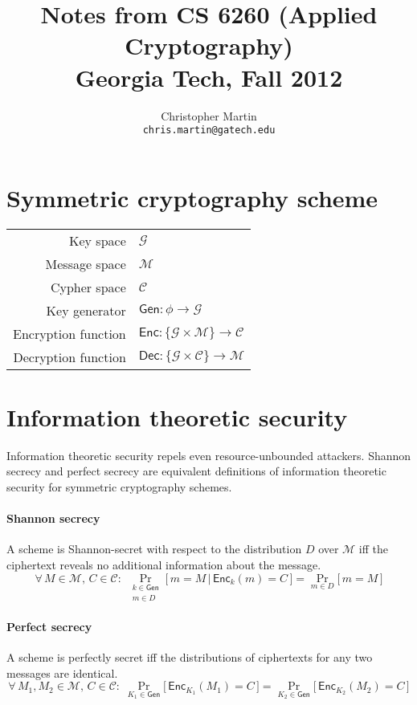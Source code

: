 \documentclass[11pt]{article}
\date{}
\title{Notes from CS 6260 (Applied Cryptography)\\Georgia Tech, Fall 2012}
\author{Christopher Martin\\{\tt chris.martin@gatech.edu}}
\newcommand{\Gen}{\mathsf{Gen}}
\newcommand{\Enc}{\mathsf{Enc}}
\newcommand{\Dec}{\mathsf{Dec}}
\begin{document}
\maketitle

\section{Symmetric cryptography scheme}

\begin{tabular}{r|l}
Key space & $\mathcal{G}$ \\
Message space & $\mathcal{M}$ \\
Cypher space & $\mathcal{C}$ \\
Key generator & $\Gen : \phi \rightarrow \mathcal{G}$ \\
Encryption function &
$\Enc : \{\mathcal{G} \times \mathcal{M}\} \rightarrow \mathcal{C}$ \\
Decryption function &
$\Dec : \{\mathcal{G} \times \mathcal{C}\} \rightarrow \mathcal{M}$
\end{tabular}

\section{Information theoretic security}

Information theoretic security repels even resource-unbounded attackers.
Shannon secrecy and perfect secrecy are equivalent definitions of
information theoretic security for symmetric cryptography schemes.

\paragraph{Shannon secrecy}
A scheme is Shannon-secret with respect to the distribution $D$ over $\mathcal{M}$
iff the ciphertext reveals no additional information about the message.
\[ \forall \, M \in \mathcal{M}, \, C \in \mathcal{C}: \;
  \Pr_{\substack{k \in \Gen\\m \in D}} \big[\, m = M \,\vert\, \Enc_k(m) = C \,\big]
= \Pr_{m\in D} \big[\, m = M \,\big] \]

\paragraph{Perfect secrecy}
A scheme is perfectly secret iff the distributions of ciphertexts for any
two messages are identical.
\[\forall\, M_1, M_2 \in \mathcal{M},\, C \in \mathcal{C}:\;
  \Pr_{K_1\in\Gen} \big[\, \Enc_{K_1}(M_1) = C \,\big]
= \Pr_{K_2\in\Gen} \big[\, \Enc_{K_2}(M_2) = C \,\big] \]
\end{document}
